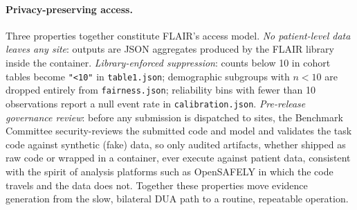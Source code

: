 \paragraph{Privacy-preserving access.} Three properties together
constitute FLAIR's access model. \emph{No patient-level data leaves
any site}: outputs are JSON aggregates produced by the FLAIR library
inside the container. \emph{Library-enforced suppression}: counts
below 10 in cohort tables become \texttt{"<10"} in
\texttt{table1.json}; demographic subgroups with $n<10$ are dropped
entirely from \texttt{fairness.json}; reliability bins with fewer than
10 observations report a null event rate in \texttt{calibration.json}.
\emph{Pre-release governance review}: before any submission is
dispatched to sites, the Benchmark Committee security-reviews the submitted
code and model and validates the task code against synthetic (fake) data, so
only audited artifacts, whether shipped as raw code or wrapped in a
container, ever execute against patient data, consistent with the spirit of
analysis platforms such as OpenSAFELY \citep{opensafely2021naturemedicine}
in which the code travels and the data does not. Together these
properties move evidence generation from the slow, bilateral DUA path
to a routine, repeatable operation.
